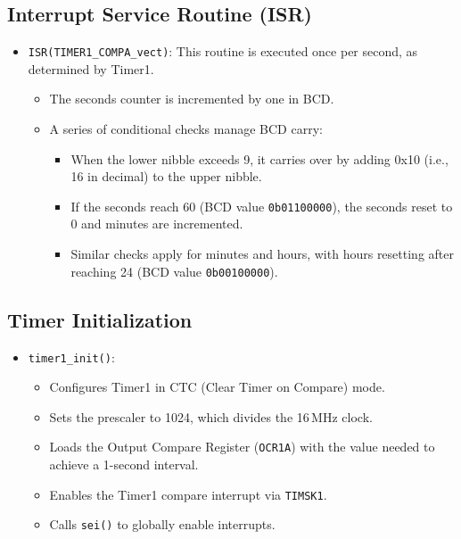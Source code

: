 \documentclass{article}
\theoremstyle{remark}
\begin{document}
\subsection{Interrupt Service Routine (ISR)}
\begin{itemize}[noitemsep]
    \item \texttt{ISR(TIMER1\_COMPA\_vect)}:  
    This routine is executed once per second, as determined by Timer1.
    \begin{itemize}[noitemsep]
        \item The seconds counter is incremented by one in BCD.
        \item A series of conditional checks manage BCD carry:
        \begin{itemize}[noitemsep]
            \item When the lower nibble exceeds 9, it carries over by adding 0x10 (i.e., 16 in decimal) to the upper nibble.
            \item If the seconds reach 60 (BCD value \texttt{0b01100000}), the seconds reset to 0 and minutes are incremented.
            \item Similar checks apply for minutes and hours, with hours resetting after reaching 24 (BCD value \texttt{0b00100000}).
        \end{itemize}
    \end{itemize}
\end{itemize}

\subsection{Timer Initialization}
\begin{itemize}[noitemsep]
    \item \texttt{timer1\_init()}:
    \begin{itemize}[noitemsep]
        \item Configures Timer1 in CTC (Clear Timer on Compare) mode.
        \item Sets the prescaler to 1024, which divides the 16\,MHz clock.
        \item Loads the Output Compare Register (\texttt{OCR1A}) with the value needed to achieve a 1-second interval.
        \item Enables the Timer1 compare interrupt via \texttt{TIMSK1}.
        \item Calls \texttt{sei()} to globally enable interrupts.
    \end{itemize}
\end{itemize}
\end{document}
